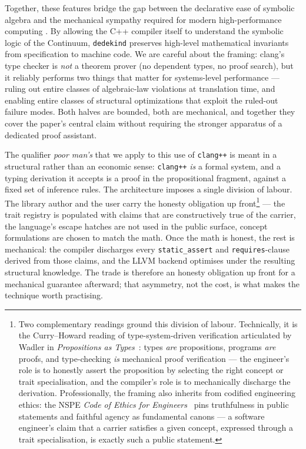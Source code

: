 \documentclass[11pt, a4paper]{report}
\begin{document}
Together, these features bridge the gap between the declarative ease of symbolic algebra and the mechanical sympathy required for modern high-performance computing \cite{thompson2011mechanical}. By allowing the C++ compiler itself to understand the symbolic logic of the Continuum, \texttt{dedekind} preserves high-level mathematical invariants from specification to machine code. We are careful about the framing: clang's type checker is \emph{not} a theorem prover (no dependent types, no proof search), but it reliably performs two things that matter for systems-level performance --- ruling out entire classes of algebraic-law violations at translation time, and enabling entire classes of structural optimizations that exploit the ruled-out failure modes. Both halves are bounded, both are mechanical, and together they cover the paper's central claim without requiring the stronger apparatus of a dedicated proof assistant.

The qualifier \emph{poor man's} that we apply to this use of \texttt{clang++} is meant in a structural rather than an economic sense: \texttt{clang++} \emph{is} a formal system, and a typing derivation it accepts is a proof in the propositional fragment, against a fixed set of inference rules. The architecture imposes a single division of labour. The library author and the user carry the honesty obligation up front\footnote{Two complementary readings ground this division of labour. Technically, it is the Curry--Howard reading of type-system-driven verification articulated by Wadler in \emph{Propositions as Types}~\cite{wadler2015propositions}: types \emph{are} propositions, programs \emph{are} proofs, and type-checking \emph{is} mechanical proof verification --- the engineer's role is to honestly assert the proposition by selecting the right concept or trait specialisation, and the compiler's role is to mechanically discharge the derivation. Professionally, the framing also inherits from codified engineering ethics: the NSPE \emph{Code of Ethics for Engineers}~\cite{nspe_ethics} pins truthfulness in public statements and faithful agency as fundamental canons --- a software engineer's claim that a carrier satisfies a given concept, expressed through a trait specialisation, is exactly such a public statement.} --- the trait registry is populated with claims that are constructively true of the carrier, the language's escape hatches are not used in the public surface, concept formulations are chosen to match the math. Once the math is honest, the rest is mechanical: the compiler discharges every \texttt{static\_assert} and \texttt{requires}-clause derived from those claims, and the LLVM backend optimises under the resulting structural knowledge. The trade is therefore an honesty obligation up front for a mechanical guarantee afterward; that asymmetry, not the cost, is what makes the technique worth practising.
\end{document}
